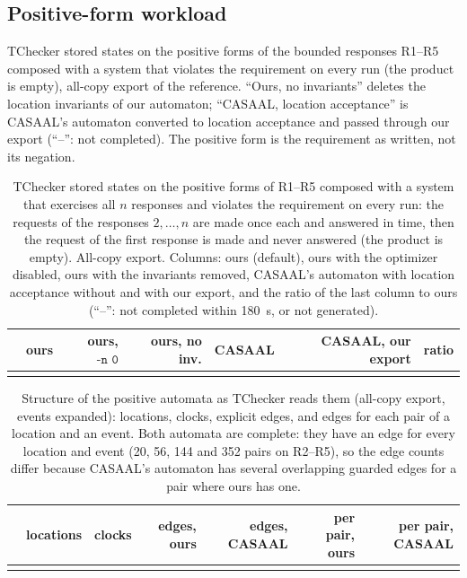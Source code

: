 \subsection{Positive-form workload}
\begin{table}[tp]
\centering
\caption{TChecker stored states on the positive forms of the bounded responses R1--R5 composed with a system that violates the requirement on every run (the product is empty), all-copy export of the reference. ``Ours, no invariants'' deletes the location invariants of our automaton; ``CASAAL, location acceptance'' is CASAAL's automaton converted to location acceptance and passed through our export (``--'': not completed). The positive form is the requirement as written, not its negation.}
\label{tab:baseline-posbad}
\small

\end{table}
\begin{table}[tp]
\centering
\caption{TChecker stored states on the positive forms of R1--R5 composed with a system that exercises all $n$ responses and violates the requirement on every run: the requests of the responses $2,\dots,n$ are made once each and answered in time, then the request of the first response is made and never answered (the product is empty). All-copy export. Columns: ours (default), ours with the optimizer disabled, ours with the invariants removed, CASAAL's automaton with location acceptance without and with our export, and the ratio of the last column to ours (``--'': not completed within 180~s, or not generated).}
\label{tab:baseline-posbadall}
\small
\begin{adjustbox}{max width=\textwidth}\begin{tabular}{@{}lrrrrrr@{}}
\toprule
 & ours & ours, $\texttt{-n 0}$ & ours, no inv. & CASAAL & CASAAL, our export & ratio \\
\midrule
\\
\bottomrule
\end{tabular}\end{adjustbox}
\end{table}
\begin{table}[tp]
\centering
\caption{Structure of the positive automata as TChecker reads them (all-copy export, events expanded): locations, clocks, explicit edges, and edges for each pair of a location and an event. Both automata are complete: they have an edge for every location and event (20, 56, 144 and 352 pairs on R2--R5), so the edge counts differ because CASAAL's automaton has several overlapping guarded edges for a pair where ours has one.}
\label{tab:struct-posbad}
\small
\begin{adjustbox}{max width=\textwidth}\begin{tabular}{@{}lrrrrrr@{}}
\toprule
 & locations & clocks & edges, ours & edges, CASAAL & per pair, ours & per pair, CASAAL \\
\midrule
\\
\bottomrule
\end{tabular}\end{adjustbox}
\end{table}
